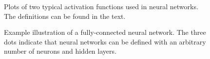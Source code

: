 \begin{figure}[t]
    \caption{Plots of two typical activation functions used in neural networks. The definitions can be found in the text.}
    \label{fig:sigmoid-relu}
\end{figure}






\begin{figure}[t]
    \caption{Example illustration of a fully-connected neural network. The three dots indicate that neural networks can be defined with an arbitrary number of neurons and hidden layers.}
    \label{fig:neural-net}
\end{figure}




